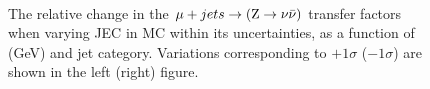 \begin{figure}[!h]
  \centering
   ~~
  \\

  \caption{\label{fig:tfSyst_jec_muToZinv} The relative change in the
  $\mu + jets \rightarrow ({\text Z} \rightarrow \nu\bar{\nu})$ transfer
  factors when varying JEC in MC within its uncertainties, as a
  function of \scalht (GeV) and jet category.
  Variations corresponding to $+1\sigma$ ($-1\sigma$) are shown in the left (right) figure. 
  }
\end{figure}

